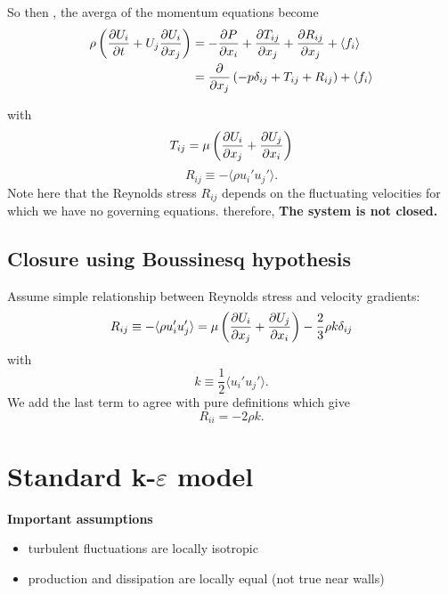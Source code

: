 \documentclass{article}
\let\epsilon\varepsilon
\begin{document}
So then , the averga of the momentum equations become 
\begin{equation}
	\begin{split}
		\rho \left(\pdv{U_{i}}{t}+U_{j}\pdv{U_{i}}{x_{j}}\right) &= -\pdv{P}{x_{i}} + \pdv{T_{ij}}{x_{j}} + \pdv{R_{ij}}{x_{j}} + \langle f_{i}\rangle \\&= \pdv{x_{j}}\left(-p\delta_{ij} + T_{ij} + R_{ij}\right) + \langle f_{i}\rangle
	\end{split}
\end{equation}

with 
\begin{equation}
	T_{ij} = \mu \left(\pdv{U_{i}}{x_{j}} + \pdv{U_{j}}{x_{i}}\right)
\end{equation}
\begin{equation}
	R_{ij} \equiv -\langle \rho u_{i}'u_{j}'\rangle.
\end{equation}
Note here that the Reynolds stress $R_{ij}$ depends on the fluctuating velocities for which we have no governing equations. therefore, \textbf{The system is not closed.}

\subsection{Closure using Boussinesq hypothesis}
Assume simple relationship between Reynolds stress and velocity gradients: 
\begin{equation}
	R_{ij} \equiv -\langle\rho u_{i}'u_{j}'\rangle = \mu \left(\pdv{U_{i}}{x_{j}} +\pdv{U_{j}}{x_{i}} \right)- \frac{2}{3}\rho k \delta_{ij}
\end{equation}
with 
\begin{equation}
	k \equiv \frac{1}{2}\langle u_{i}'u_{j}'\rangle.
\end{equation}
We add the last term to agree with pure definitions which give 
\begin{equation}
	R_{ii} = -2\rho k.
\end{equation}


\section{Standard k-$\epsilon$ model}

\textbf{Important assumptions}
\begin{itemize}
	\item turbulent fluctuations are locally isotropic
	\item production and dissipation are locally equal (not true near walls)
\end{itemize}
\end{document}
